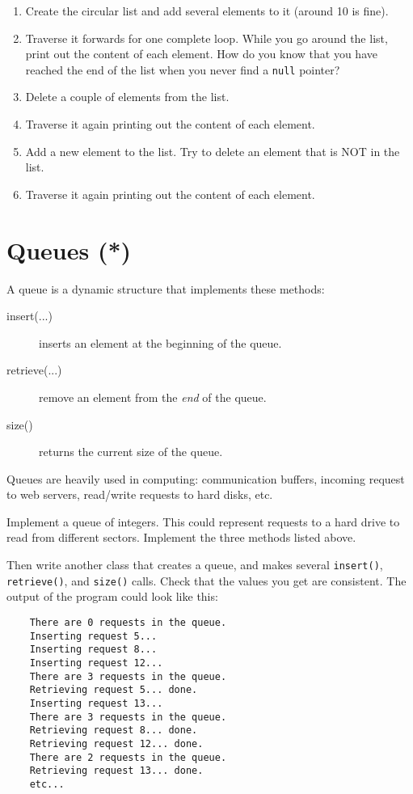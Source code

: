\documentclass{article}
\begin{document}
\begin{enumerate}
\item Create the circular list and add several elements to it
  (around 10 is fine). 
\item Traverse it forwards for one complete loop. While you go around
  the list, print out the content of each element. How do you know
  that you have reached the end of the list when you never find a
  \verb+null+ pointer? 
\item Delete a couple of elements from the list. 
\item Traverse it again printing out the content of
  each element.
\item Add a new element to the list. Try to delete an element that is
  NOT in the list. 
\item Traverse it again printing out the content of
  each element.
\end{enumerate}

\section{Queues (*)}
\label{sec:queues}

A queue is a dynamic structure that implements these methods: 

\begin{description}
\item[insert(...)] inserts an element at the beginning of the queue.
\item[retrieve(...) ] remove an element from the \emph{end} of the queue.
\item[size() ] returns the current size of the queue. 
\end{description}

Queues are heavily used in computing: communication
buffers, incoming request to web servers, read/write requests to hard
disks, etc. 

Implement a queue of integers. This could represent requests
to a hard drive to read from different sectors. Implement the three
methods listed above. 

Then write another class that creates a queue, and makes several
\verb+insert()+, \verb+retrieve()+, and \verb+size()+ calls. Check
that the values you get are consistent. The output of the program
could look like this: 

\begin{verbatim}
    There are 0 requests in the queue.
    Inserting request 5...
    Inserting request 8...
    Inserting request 12...
    There are 3 requests in the queue.
    Retrieving request 5... done. 
    Inserting request 13...
    There are 3 requests in the queue.
    Retrieving request 8... done. 
    Retrieving request 12... done. 
    There are 2 requests in the queue.
    Retrieving request 13... done. 
    etc...
\end{verbatim}
\end{document}
